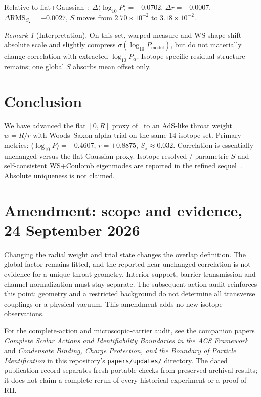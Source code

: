 \documentclass[11pt,a4paper]{article}
\theoremstyle{remark}
\newtheorem*{remark}{Remark}
\begin{document}
Relative to flat+Gaussian~\cite{PalphaOverlap2026}:
$\Delta\langle\log_{10} P\rangle=-0.0702$,
$\Delta r=-0.0007$,
$\Delta\mathrm{RMS}_{S_\star}=+0.0027$,
$S$ moves from $2.70\times 10^{-2}$ to $3.18\times 10^{-2}$.

\begin{remark}[Interpretation]
On this set, warped measure and WS shape shift absolute scale and
slightly compress $\sigma(\log_{10} P_{\mathrm{model}})$, but do not
materially change correlation with extracted $\log_{10} P_\alpha$.
Isotope-specific residual structure remains; one global $S$ absorbs mean
offset only.
\end{remark}

\section{Conclusion}
We have advanced the flat $[0,R]$ proxy of~\cite{PalphaOverlap2026} to
an AdS-like throat weight $w=R/r$ with Woods--Saxon alpha trial on the
same 14-isotope set.  Primary metrics:
$\langle\log_{10} P\rangle=-0.4607$, $r=+0.8875$,
$S_\star\approx 0.032$.  Correlation is essentially unchanged versus the
flat-Gaussian proxy.  Isotope-resolved / parametric $S$ and
self-consistent WS+Coulomb eigenmodes are reported in the refined
sequel~\cite{PalphaRefined2026}.  Absolute uniqueness is not claimed.


\section*{Amendment: scope and evidence, 24 September 2026}
Changing the radial weight and trial state changes the overlap definition. The global factor remains fitted, and the reported near-unchanged correlation is not evidence for a unique throat geometry. Interior support, barrier transmission and channel normalization must stay separate. The subsequent action audit reinforces this point: geometry and a restricted background do not determine all transverse couplings or a physical vacuum. This amendment adds no new isotope observations.

For the complete-action and microscopic-carrier audit, see the companion
papers \emph{Complete Scalar Actions and Identifiability Boundaries in the ACS
Framework} and \emph{Condensate Binding, Charge Protection, and the Boundary
of Particle Identification} in this repository's \texttt{papers/updates/}
directory. The dated publication record separates fresh portable checks
from preserved archival results; it does not claim a complete rerun of every
historical experiment or a proof of RH.
\end{document}
